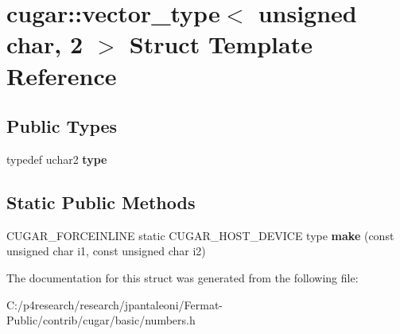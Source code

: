 \hypertarget{structcugar_1_1vector__type_3_01unsigned_01char_00_012_01_4}{}\section{cugar\+:\+:vector\+\_\+type$<$ unsigned char, 2 $>$ Struct Template Reference}
\label{structcugar_1_1vector__type_3_01unsigned_01char_00_012_01_4}
\subsection*{Public Types}
\begin{DoxyCompactItemize}
\item 
\mbox{\label{structcugar_1_1vector__type_3_01unsigned_01char_00_012_01_4_a806e276f4d71c29c8c1c54bc5c64a3a7}} 
typedef uchar2 {\bfseries type}
\end{DoxyCompactItemize}
\subsection*{Static Public Methods}
\begin{DoxyCompactItemize}
\item 
\mbox{\label{structcugar_1_1vector__type_3_01unsigned_01char_00_012_01_4_ac2229b1560dc462ce62fb140b40d36e8}} 
C\+U\+G\+A\+R\+\_\+\+F\+O\+R\+C\+E\+I\+N\+L\+I\+NE static C\+U\+G\+A\+R\+\_\+\+H\+O\+S\+T\+\_\+\+D\+E\+V\+I\+CE type {\bfseries make} (const unsigned char i1, const unsigned char i2)
\end{DoxyCompactItemize}


The documentation for this struct was generated from the following file\+:\begin{DoxyCompactItemize}
\item 
C\+:/p4research/research/jpantaleoni/\+Fermat-\/\+Public/contrib/cugar/basic/numbers.\+h\end{DoxyCompactItemize}

